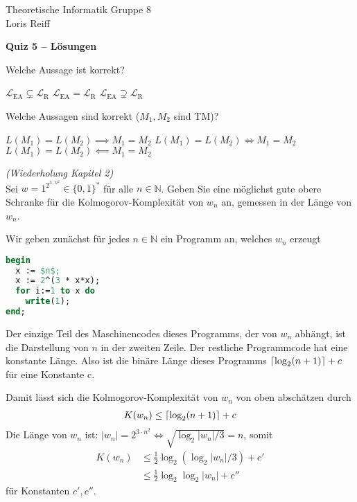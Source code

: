 \documentclass[a4paper,ngerman,12pt]{exam}
\DeclarePairedDelimiter\ceil{\lceil}{\rceil}
\begin{document}
\noindent Theoretische Informatik \hfill Gruppe 8 \\
\mbox{}\hfill Loris Reiff
\begin{center}
  \bfseries\Large
  Quiz 5\ifprintanswers
  -- Lösungen
\fi
\end{center}

\begin{questions}
  \question
  Welche Aussage ist korrekt?
  \begin{checkboxes}
    \CorrectChoice $\mathcal{L}_{\mathrm{EA}} \subsetneq
          \mathcal{L}_{\mathrm{R}}$
    \choice $\mathcal{L}_{\mathrm{EA}} =
          \mathcal{L}_{\mathrm{R}}$
    \choice $\mathcal{L}_{\mathrm{EA}}\supsetneq
          \mathcal{L}_{\mathrm{R}}$
  \end{checkboxes}

  \question
  Welche Aussagen sind korrekt ($M_1, M_2$ sind TM)?
  \begin{checkboxes}
    \choice $L(M_1) = L(M_2) \implies M_1 = M_2$
    \choice $L(M_1) = L(M_2) \iff M_1 = M_2$
    \CorrectChoice $L(M_1) = L(M_2) \impliedby M_1 = M_2$
  \end{checkboxes}

\question \textit{(Wiederholung Kapitel 2)} \\
  Sei $w = 1^{2^{3\cdot n^2}} \in \{0,1\}^*$ für alle $n \in \mathbb{N}$.
Geben Sie eine möglichst gute obere
Schranke für die Kolmogorov-Komplexität von $w_n$ an, gemessen in der Länge von
$w_n$.

\begin{solutionorbox}[29em]
  Wir geben zunächst für jedes $n\in \mathbb{N}$ ein Programm an, welches
  $w_n$ erzeugt
\begin{lstlisting}[language=Pascal, mathescape=true]
begin
  x := $n$;
  x := 2^(3 * x*x);
  for i:=1 to x do
    write(1);
end;
\end{lstlisting}
Der einzige Teil des Maschinencodes dieses Programms, der von $w_n$ abhängt, ist
die Darstellung von $n$ in der zweiten Zeile.
Der restliche Programmcode hat eine konstante Länge.
Also ist die binäre Länge dieses Programms $\ceil{\log_2 (n + 1)} + c$ für
eine Konstante c.

Damit lässt sich die Kolmogorov-Komplexität von $w_n$ von oben abschätzen durch
  \begin{align*}
    K(w_n) \leq \ceil{\log_2 (n + 1)} + c
  \end{align*}
  Die Länge von $w_n$ ist: $|w_n| = 2^{3 \cdot n^2} \iff \sqrt{\log_2 |w_n|/3} = n$,
  somit
  \begin{align*}
    K(w_n) &\leq \frac{1}{2}\log_2 (\log_2 |w_n|/3 ) + c' \\
      &\leq \frac{1}{2}\log_2 \log_2 |w_n| + c''
  \end{align*}
  für Konstanten $c', c''$.
    \end{solutionorbox}

\end{questions}
\end{document}
